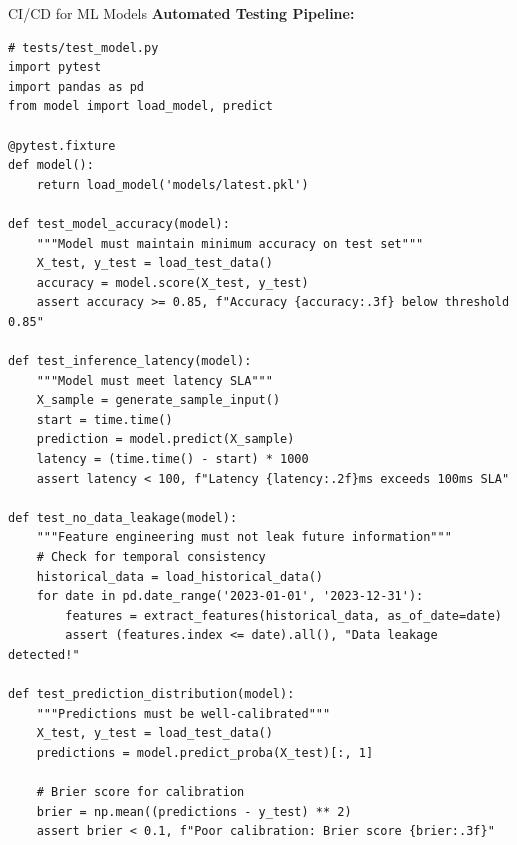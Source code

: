 \begin{frame}[fragile]{CI/CD for ML Models}
\textbf{Automated Testing Pipeline:}
\begin{lstlisting}[basicstyle=\ttfamily\tiny]
# tests/test_model.py
import pytest
import pandas as pd
from model import load_model, predict

@pytest.fixture
def model():
    return load_model('models/latest.pkl')

def test_model_accuracy(model):
    """Model must maintain minimum accuracy on test set"""
    X_test, y_test = load_test_data()
    accuracy = model.score(X_test, y_test)
    assert accuracy >= 0.85, f"Accuracy {accuracy:.3f} below threshold 0.85"

def test_inference_latency(model):
    """Model must meet latency SLA"""
    X_sample = generate_sample_input()
    start = time.time()
    prediction = model.predict(X_sample)
    latency = (time.time() - start) * 1000
    assert latency < 100, f"Latency {latency:.2f}ms exceeds 100ms SLA"

def test_no_data_leakage(model):
    """Feature engineering must not leak future information"""
    # Check for temporal consistency
    historical_data = load_historical_data()
    for date in pd.date_range('2023-01-01', '2023-12-31'):
        features = extract_features(historical_data, as_of_date=date)
        assert (features.index <= date).all(), "Data leakage detected!"

def test_prediction_distribution(model):
    """Predictions must be well-calibrated"""
    X_test, y_test = load_test_data()
    predictions = model.predict_proba(X_test)[:, 1]

    # Brier score for calibration
    brier = np.mean((predictions - y_test) ** 2)
    assert brier < 0.1, f"Poor calibration: Brier score {brier:.3f}"
\end{lstlisting}
\end{frame}

